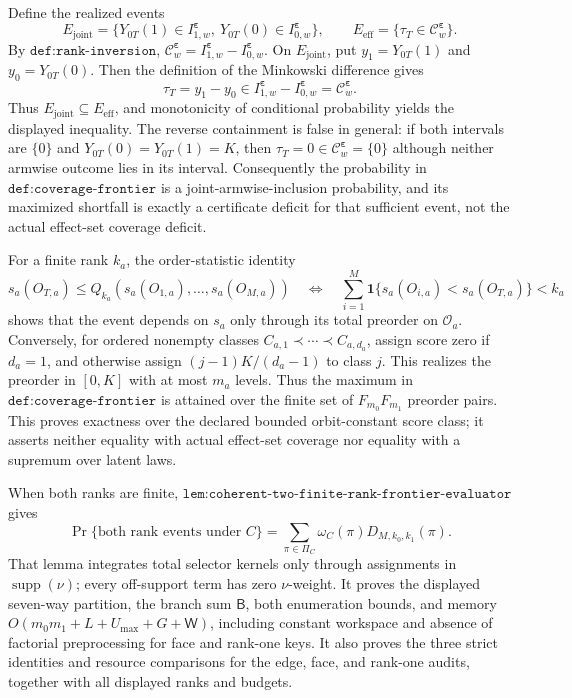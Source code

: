 Define the realized events
\[
E_{\mathrm{joint}}=\{Y_{0T}(1)\in I^{\boldsymbol\varepsilon}_{1,w},\ Y_{0T}(0)\in I^{\boldsymbol\varepsilon}_{0,w}\},\qquad
E_{\mathrm{eff}}=\{\tau_T\in\mathcal C^{\boldsymbol\varepsilon}_w\}.
\]
By \(\texttt{def:rank-inversion}\), \(\mathcal C^{\boldsymbol\varepsilon}_w=I^{\boldsymbol\varepsilon}_{1,w}-I^{\boldsymbol\varepsilon}_{0,w}\). On \(E_{\mathrm{joint}}\), put \(y_1=Y_{0T}(1)\) and \(y_0=Y_{0T}(0)\). Then the definition of the Minkowski difference gives
\[
\tau_T=y_1-y_0\in I^{\boldsymbol\varepsilon}_{1,w}-I^{\boldsymbol\varepsilon}_{0,w}=\mathcal C^{\boldsymbol\varepsilon}_w.
\tag{A}
\]
Thus \(E_{\mathrm{joint}}\subseteq E_{\mathrm{eff}}\), and monotonicity of conditional probability yields the displayed inequality. The reverse containment is false in general: if both intervals are \(\{0\}\) and \(Y_{0T}(0)=Y_{0T}(1)=K\), then \(\tau_T=0\in\mathcal C^{\boldsymbol\varepsilon}_w=\{0\}\) although neither armwise outcome lies in its interval. Consequently the probability in \(\texttt{def:coverage-frontier}\) is a joint-armwise-inclusion probability, and its maximized shortfall is exactly a certificate deficit for that sufficient event, not the actual effect-set coverage deficit.

For a finite rank \(k_a\), the order-statistic identity
\[
s_a(O_{T,a})\le Q_{k_a}(s_a(O_{1,a}),\ldots,s_a(O_{M,a}))
\quad\Longleftrightarrow\quad
\sum_{i=1}^M\mathbf 1\{s_a(O_{i,a})<s_a(O_{T,a})\}<k_a
\tag{1}
\]
shows that the event depends on \(s_a\) only through its total preorder on \(\mathcal O_a\). Conversely, for ordered nonempty classes \(C_{a,1}\prec\cdots\prec C_{a,d_a}\), assign score zero if \(d_a=1\), and otherwise assign \((j-1)K/(d_a-1)\) to class \(j\). This realizes the preorder in \([0,K]\) with at most \(m_a\) levels. Thus the maximum in \(\texttt{def:coverage-frontier}\) is attained over the finite set of \(F_{m_0}F_{m_1}\) preorder pairs. This proves exactness over the declared bounded orbit-constant score class; it asserts neither equality with actual effect-set coverage nor equality with a supremum over latent laws.

When both ranks are finite, \(\texttt{lem:coherent-two-finite-rank-frontier-evaluator}\) gives
\[
\Pr\{\text{both rank events under }C\}=\sum_{\pi\in\Pi_C}\omega_C(\pi)D_{M,k_0,k_1}(\pi).
\tag{2}
\]
That lemma integrates total selector kernels only through assignments in \(\operatorname{supp}(\nu)\); every off-support term has zero \(\nu\)-weight. It proves the displayed seven-way partition, the branch sum \(\mathsf B\), both enumeration bounds, and memory \(O(m_0m_1+L+U_{\max}+G+\mathsf W)\), including constant workspace and absence of factorial preprocessing for face and rank-one keys. It also proves the three strict identities and resource comparisons for the edge, face, and rank-one audits, together with all displayed ranks and budgets.

